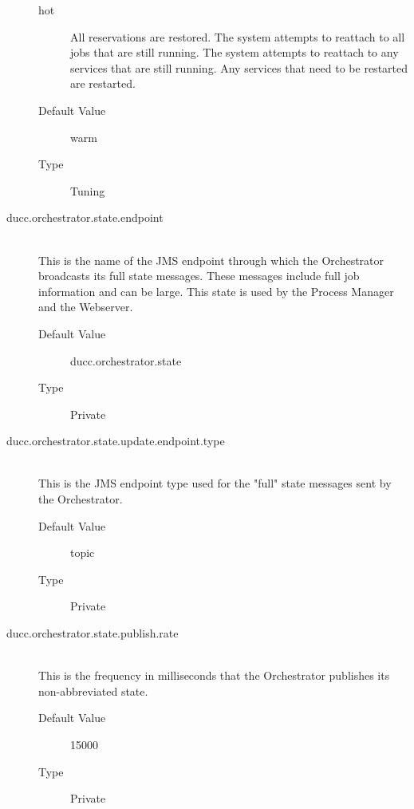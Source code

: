 \begin{description}
\begin{description}
            \item[hot] All reservations are restored. The system attempts to reattach to all jobs that are 
              still running. The system attempts to reattach to any services that are still running. 
              Any services that need to be restarted are restarted.
            \end{description}

          \begin{description}
          \item[Default Value] warm 
          \item[Type] Tuning 
        \end{description}
        

      \item[ducc.orchestrator.state.endpoint] \hfill \\
        This is the name of the JMS endpoint through which the Orchestrator broadcasts its full 
        state messages. These messages include full job information and can be large. This state is 
        used by the Process Manager and the Webserver. 
        \begin{description}
          \item[Default Value] ducc.orchestrator.state 
          \item[Type] Private 
        \end{description}

      \item[ducc.orchestrator.state.update.endpoint.type] \hfill \\
        This is the JMS endpoint type used for the "full" state messages sent by the Orchestrator. 
        \begin{description}
          \item[Default Value] topic 
          \item[Type] Private
        \end{description} 
        
      \item[ducc.orchestrator.state.publish.rate] \hfill \\
        This is the frequency in milliseconds that the Orchestrator publishes its non-abbreviated 
        state. 
        \begin{description}
          \item[Default Value] 15000 
          \item[Type] Private 
        \end{description}
        

\end{description}
